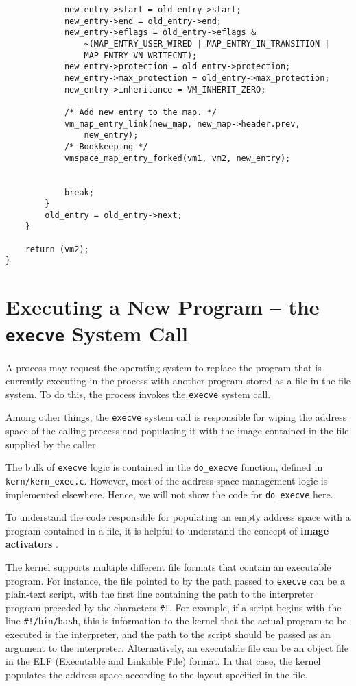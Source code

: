 \documentclass[shortabstract, english]{iithesis}
\newenvironment{code}{}{}
\begin{document}
\begin{code}
\begin{verbatim}
            new_entry->start = old_entry->start;
            new_entry->end = old_entry->end;
            new_entry->eflags = old_entry->eflags &
                ~(MAP_ENTRY_USER_WIRED | MAP_ENTRY_IN_TRANSITION |
                MAP_ENTRY_VN_WRITECNT);
            new_entry->protection = old_entry->protection;
            new_entry->max_protection = old_entry->max_protection;
            new_entry->inheritance = VM_INHERIT_ZERO;

            /* Add new entry to the map. */
            vm_map_entry_link(new_map, new_map->header.prev,
                new_entry);
            /* Bookkeeping */
            vmspace_map_entry_forked(vm1, vm2, new_entry);


            break;
        }
        old_entry = old_entry->next;
    }

    return (vm2);
}
\end{verbatim}
\end{code}

\section{Executing a New Program -- the \texttt{execve} System Call}

A process may request the operating system to replace the program that is
currently executing in the process with another program stored as a file in the
file system. To do this, the process invokes the \texttt{execve} system call.

Among other things, the \texttt{execve} system call is responsible for wiping
the address space of the calling process and populating it with the image
contained in the file supplied by the caller.

The bulk of \texttt{execve} logic is contained in the \texttt{do_execve}
function, defined in \texttt{kern/kern\_exec.c}. However, most of the address
space management logic is implemented elsewhere. Hence, we will not show the
code for \texttt{do_execve} here.

To understand the code responsible for populating an empty address space with a
program contained in a file, it is helpful to understand the concept of
\textbf{image activators} \cite[Section~3.5]{bib:mckusick04}.

The kernel supports multiple different file formats that contain an executable
program. For instance, the file pointed to by the path passed to \texttt{execve}
can be a plain-text script, with the first line containing the path to the
interpreter program preceded by the characters \texttt{\#!}. For example, if a
script begins with the line \texttt{\#!/bin/bash}, this is information to the
kernel that the actual program to be executed is the interpreter, and the path
to the script should be passed as an argument to the interpreter. Alternatively,
an executable file can be an object file in the ELF (Executable and Linkable
File) format. In that case, the kernel populates the address space according to
the layout specified in the file.
\end{document}
